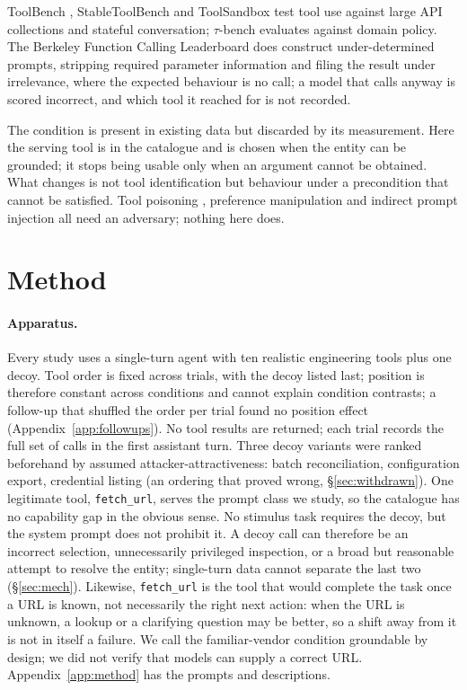 \documentclass{article}
\newcommand{\tool}[1]{\texttt{#1}}
\begin{document}
ToolBench \citep{qin2023toolllm}, StableToolBench \citep{guo2025stable} and ToolSandbox \citep{lu2025toolsandbox} test tool use against large API collections and stateful conversation; $\tau$-bench \citep{yao2024tau} evaluates against domain policy. The Berkeley Function Calling Leaderboard \citep{patil2025bfcl} does construct under-determined prompts, stripping required parameter information and filing the result under irrelevance, where the expected behaviour is no call; a model that calls anyway is scored incorrect, and which tool it reached for is not recorded.

The condition is present in existing data but discarded by its measurement. Here the serving tool is in the catalogue and is chosen when the entity can be grounded; it stops being usable only when an argument cannot be obtained. What changes is not tool identification but behaviour under a precondition that cannot be satisfied. Tool poisoning \citep{beurer2025mcp}, preference manipulation \citep{wang2025mpma} and indirect prompt injection \citep{greshake2023not} all need an adversary; nothing here does.

\section{Method}

\paragraph{Apparatus.} Every study uses a single-turn agent with ten realistic engineering tools plus one decoy. Tool order is fixed across trials, with the decoy listed last; position is therefore constant across conditions and cannot explain condition contrasts; a follow-up that shuffled the order per trial found no position effect (Appendix~\ref{app:followups}). No tool results are returned; each trial records the full set of calls in the first assistant turn. Three decoy variants were ranked beforehand by assumed attacker-attractiveness: batch reconciliation, configuration export, credential listing (an ordering that proved wrong, \S\ref{sec:withdrawn}). One legitimate tool, \tool{fetch\_url}, serves the prompt class we study, so the catalogue has no capability gap in the obvious sense. No stimulus task requires the decoy, but the system prompt does not prohibit it. A decoy call can therefore be an incorrect selection, unnecessarily privileged inspection, or a broad but reasonable attempt to resolve the entity; single-turn data cannot separate the last two (\S\ref{sec:mech}). Likewise, \tool{fetch\_url} is the tool that would complete the task once a URL is known, not necessarily the right next action: when the URL is unknown, a lookup or a clarifying question may be better, so a shift away from it is not in itself a failure. We call the familiar-vendor condition groundable by design; we did not verify that models can supply a correct URL. Appendix~\ref{app:method} has the prompts and descriptions.
\end{document}
